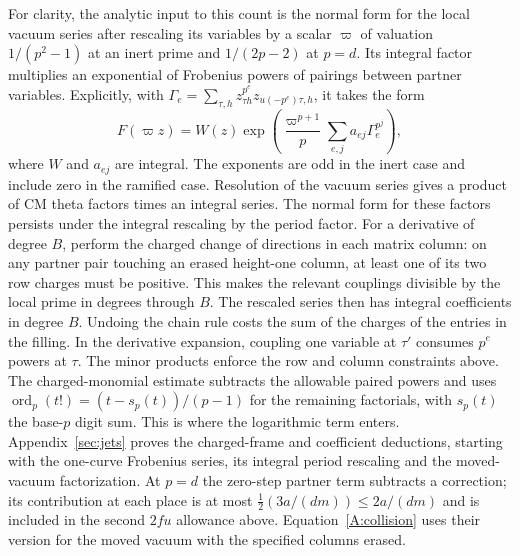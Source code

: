 For clarity, the analytic input to this count is the normal form for the local vacuum series after rescaling its variables by a scalar $\varpi$ of valuation $1/(p^2-1)$ at an inert prime and $1/(2p-2)$ at $p=d$. Its integral factor multiplies an exponential of Frobenius powers of pairings between partner variables. Explicitly, with $\Gamma_e=\sum_{\tau,h}z_{\tau h}^{p^e}z_{u(-p^e)\tau,h}$, it takes the form
\[
 F(\varpi z)=W(z)\exp\left(\frac{\varpi^{p+1}}{p}
          \sum_{e,j} a_{ej}\Gamma_e^{p^j}\right),
\]
where $W$ and $a_{ej}$ are integral. The exponents are odd in the inert case and include zero in the ramified case. Resolution of the vacuum series gives a product of CM theta factors times an integral series. The normal form for these factors persists under the integral rescaling by the period factor. For a derivative of degree $B$, perform the charged change of directions in each matrix column: on any partner pair touching an erased height-one column, at least one of its two row charges must be positive. This makes the relevant couplings divisible by the local prime in degrees through $B$. The rescaled series then has integral coefficients in degree $B$. Undoing the chain rule costs the sum of the charges of the entries in the filling. In the derivative expansion, coupling one variable at $\tau'$ consumes $p^e$ powers at $\tau$. The minor products enforce the row and column constraints above. The charged-monomial estimate subtracts the allowable paired powers and uses $\operatorname{ord}_p(t!)=(t-s_p(t))/(p-1)$ for the remaining factorials, with $s_p(t)$ the base-$p$ digit sum. This is where the logarithmic term enters. Appendix~\ref{sec:jets} proves the charged-frame and coefficient deductions, starting with the one-curve Frobenius series, its integral period rescaling and the moved-vacuum factorization. At $p=d$ the zero-step partner term subtracts a correction; its contribution at each place is at most $\tfrac12(3a/(dm))\le2a/(dm)$ and is included in the second $2fu$ allowance above. Equation~\eqref{A:collision} uses their version for the moved vacuum with the specified columns erased.

